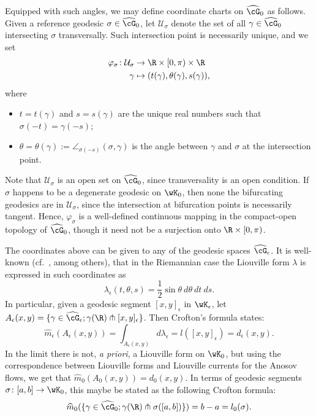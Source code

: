 \documentclass[reqno,11pt]{amsart}
\begin{document}
    \par Equipped with such angles, we may define coordinate charts on \(\widehat{\cG}_0\) as follows.
    Given a reference geodesic \(\sigma \in \widehat{\cG}_0\), let \(\mathcal{U}_\sigma\) denote the set of all \(\gamma \in \widehat{\cG}_0\) intersecting \(\sigma\) transversally.
    Such intersection point is necessarily unique, and we set
    \begin{align*} 
        \varphi_\sigma\colon \mathcal{U}_\sigma &\to \R \times [0, \pi) \times \R\\
        \gamma &\mapsto (t(\gamma), \theta(\gamma), s(\gamma)),
    \end{align*}
    where
    \begin{itemize}
        \item[(i)] \(t = t(\gamma)\) and \(s = s(\gamma)\) are the unique real numbers such that \(\sigma(-t) = \gamma(-s)\);
        \item[(ii)] \(\theta = \theta(\gamma):= \angle_{\sigma(-s)}(\sigma, \gamma)\) is the angle between \(\gamma\) and \(\sigma\) at the intersection point.
    \end{itemize}
    Note that \(\mathcal{U}_\sigma\) is an open set on \(\widehat{\cG}_0\), since transversality is an open condition. 
    If \(\sigma\) happens to be a degenerate geodesic on \(\wK_0\), then none the bifurcating geodesics are in \(\mathcal{U}_\sigma\), since the intersection at bifurcation points is necessarily tangent.
    Hence, \(\varphi_\sigma\) is a well-defined  continuous mapping in the compact-open topology of \(\widehat{\cG}_0\), though it need not be a surjection onto \(\R \times [0, \pi)\).

    \par The coordinates above can be given to any of the geodesic spaces \(\widehat{\cG}_\epsilon\). 
    It is well-known (cf.~\cite{otal_spectre_1990, wilkinson_anosov, bankovic_marked-length-spectral_2017}, among others), that in the Riemannian case the Liouville form \(\lambda\) is expressed in such coordinates as
    \[
        \lambda_{\epsilon}(t,\theta,s) = \frac{1}{2}\sin\theta\ d\theta \ dt \ ds.
    \]
    In particular, given a geodesic segment \([x,y]_\epsilon\) in \(\wK_{\epsilon}\), let \(A_\epsilon(x,y) = \{\gamma \in \widehat{\cG}_\epsilon; \gamma(\R) \pitchfork [x,y]_\epsilon\}\).
    Then Crofton's formula states:
    \[
        \widehat{m}_\epsilon(A_\epsilon(x,y)) = \int_{A_\epsilon(x,y)} d\lambda_\epsilon = l([x,y]_\epsilon) = d_\epsilon(x,y).
    \]
    In the limit there is not, \textit{a priori}, a Liouville form on \(\wK_0\), but using the correspondence between Liouville forms and Liouville currents for the Anosov flows, we get that \(\widehat{m}_0(A_0(x,y)) = d_0(x,y)\).
    In terms of geodesic segments \(\sigma\colon [a,b] \to \wK_0\), this maybe be stated as the following Crofton formula:
    \begin{equation}\label{eq:crofton_height_0}
        \widehat{m}_0(\{\gamma \in \widehat{\cG}_0; \gamma(\R) \pitchfork \sigma([a,b])\}) = b-a = l_0(\sigma).
    \end{equation}      
    
\end{document}
